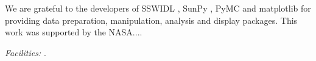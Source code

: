 \documentclass[manuscript]{../aastex52/aastex}
\begin{document}


\acknowledgments

We are grateful to the developers of SSWIDL \cite{}, SunPy \cite{},
PyMC \cite{} and matplotlib \cite{} for providing data preparation,
manipulation, analysis and display packages.  This work was supported
by the NASA....



{\it Facilities:} .


\end{document}
